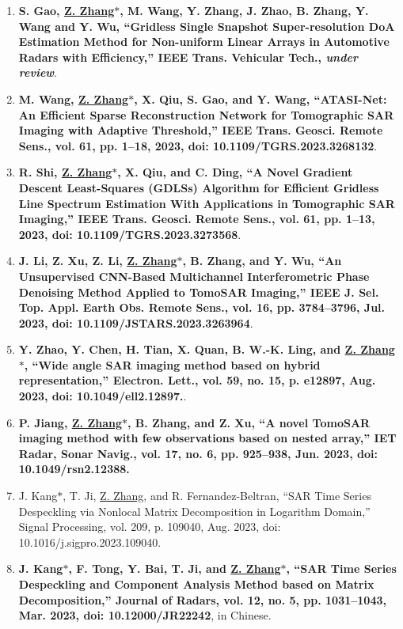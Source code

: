 \documentclass[paper=a4,fontsize=11pt]{scrartcl}
\begin{document}
\begin{enumerate}
	\item \textbf{S. Gao, \underline{Z. Zhang$\ast$}, M. Wang, Y. Zhang, J. Zhao, B. Zhang, Y. Wang and Y. Wu, ``Gridless Single Snapshot Super-resolution DoA Estimation Method for Non-uniform Linear Arrays in Automotive Radars with Efficiency,'' IEEE Trans. Vehicular Tech., \emph{under review}}.
	
	\item \textbf{M. Wang, \underline{Z. Zhang$\ast$}, X. Qiu, S. Gao, and Y. Wang, ``ATASI-Net: An Efficient Sparse Reconstruction Network for Tomographic SAR Imaging with Adaptive Threshold,'' IEEE Trans. Geosci. Remote Sens., vol. 61, pp. 1–18, 2023, doi: 10.1109/TGRS.2023.3268132}.	
	
	\item \textbf{R. Shi, \underline{Z. Zhang$\ast$}, X. Qiu, and C. Ding, ``A Novel Gradient Descent Least-Squares (GDLSs) Algorithm for Efficient Gridless Line Spectrum Estimation With Applications in Tomographic SAR Imaging,'' IEEE Trans. Geosci. Remote Sens., vol. 61, pp. 1–13, 2023, doi: 10.1109/TGRS.2023.3273568}.
	
	\item \textbf{J. Li, Z. Xu, Z. Li, \underline{Z. Zhang$\ast$}, B. Zhang, and Y. Wu, ``An Unsupervised CNN-Based Multichannel Interferometric Phase Denoising Method Applied to TomoSAR Imaging,'' IEEE J. Sel. Top. Appl. Earth Obs. Remote Sens., vol. 16, pp. 3784–3796, Jul. 2023, doi: 10.1109/JSTARS.2023.3263964}.
	
	\item \textbf{Y. Zhao, Y. Chen, H. Tian, X. Quan, B. W.-K. Ling, and \underline{Z. Zhang$\ast$}, ``Wide angle SAR imaging method based on hybrid representation,'' Electron. Lett., vol. 59, no. 15, p. e12897, Aug. 2023, doi: 10.1049/ell2.12897.}.
	
	\item \textbf{P. Jiang, \underline{Z. Zhang$\ast$}, B. Zhang, and Z. Xu, ``A novel TomoSAR imaging method with few observations based on nested array,'' IET Radar, Sonar Navig., vol. 17, no. 6, pp. 925–938, Jun. 2023, doi: 10.1049/rsn2.12388.}
	
	\item J. Kang$\ast$, T. Ji, \underline{Z. Zhang}, and R. Fernandez-Beltran, ``SAR Time Series Despeckling via Nonlocal Matrix Decomposition in Logarithm Domain,'' Signal Processing, vol. 209, p. 109040, Aug. 2023, doi: 10.1016/j.sigpro.2023.109040.
	
	\item \textbf{J. Kang$\ast$, F. Tong, Y. Bai, T. Ji, and \underline{Z. Zhang$\ast$}, ``SAR Time Series Despeckling and Component Analysis Method based on Matrix Decomposition,'' Journal of Radars, vol. 12, no. 5, pp. 1031–1043, Mar. 2023, doi: 10.12000/JR22242}, in Chinese.
	

\end{enumerate}
\end{document}
